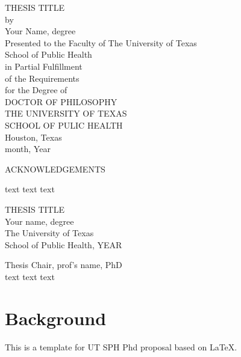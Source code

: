 \documentclass[12pt]{article}
\begin{document}
\newpage
\thispagestyle{empty}
\doublespacing
\begin{center}
{\normalsize THESIS TITLE}\\[3.2cm]

by\\[0.5cm]

Your Name, degree\\[3.2cm]

Presented to the Faculty of The University of Texas\\
School of Public Health\\
in Partial Fulfillment\\
of the Requirements\\
for the Degree of\\[1.5cm]
DOCTOR OF PHILOSOPHY\\[1.5cm]
\singlespacing
THE UNIVERSITY OF TEXAS\\
SCHOOL OF PULIC HEALTH\\
Houston, Texas\\
month, Year
\end{center}


\newpage
\thispagestyle{empty}
\doublespacing
\begin{center}
ACKNOWLEDGEMENTS
\end{center}
text text text


\newpage
\thispagestyle{empty}
\doublespacing
\begin{center}
{\normalsize THESIS TITLE}\\[2.3cm]
\singlespacing
Your name, degree\\
The University of Texas\\
School of Public Health, YEAR
\end{center}

\doublespacing
\noindent
Thesis Chair, prof's name, PhD\\
\indent
text text text



\newpage
\tableofcontents

\newpage
\listoftables

\newpage
\listoffigures
 

\newpage
\section{Background}\label{sec:background}
\doublespacing
This is a template for UT SPH Phd proposal based on \LaTeX \cite{lamport1986document}.
\end{document}
